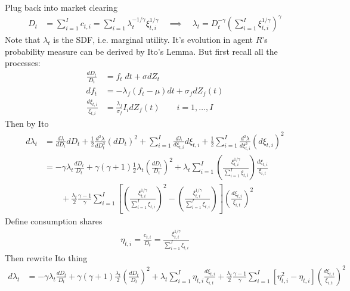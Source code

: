 \documentclass[12pt]{article}
\theoremstyle{plain}
\theoremstyle{definition}
\theoremstyle{remark}
\begin{document}
Plug back into market clearing
\begin{align*}
  D_t
  &=
  \sum_{i=1}^I c_{t,i}
  =
  \sum_{i=1}^I
  \lambda_t^{-1/\gamma}
  \xi_{t,i}^{1/\gamma}
  \quad\implies\quad
  \lambda_t
  =
  D_t^{-\gamma}
  \left(
  \sum_{i=1}^I
  \xi_{t,i}^{1/\gamma}
  \right)^{\gamma}
\end{align*}
Note that $\lambda_t$ is the SDF, i.e. marginal utility.
It's evolution in agent $R$'s probability measure can be derived by
Ito's Lemma. But first recall all the processes:
\begin{align*}
  \frac{dD_t}{D_t}
  &=
  f_t\;dt + \sigma dZ_t
  \\
  df_t
  &=
  -\lambda_f
  (f_t-\mu)dt
  + \sigma_f dZ_f(t)
  \\
  \frac{d\xi_{t,i}}{\xi_{t,i}}
  &=
  \frac{\lambda_f}{\sigma_f} I_i
  dZ_f(t)
  \qquad i = 1,\ldots,I
\end{align*}
Then by Ito
\begin{align*}
  d\lambda_t
  &=
  \frac{d\lambda}{dD_t}
  dD_t
  +
  \frac{1}{2}
  \frac{d^2\lambda}{dD_t^2}
  (dD_t)^2
  +
  \sum_{i=1}^I
  \frac{d\lambda}{d\xi_{t,i}}
  d\xi_{t,i}
  +
  \frac{1}{2}
  \sum_{i=1}^I
  \frac{d^2\lambda}{d\xi_{t,i}^2}
  (d\xi_{t,i})^2
  \\
  &=
  -\gamma
  \lambda_t
  \frac{dD_t}{D_t}
  +
  \gamma(\gamma+1)
  \frac{1}{2}
  \lambda_t
  \left(
  \frac{dD_t}{D_t}
  \right)^2
  +
  \lambda_t
  \sum_{i=1}^I
  \left(
  \frac{\xi_{t,i}^{1/\gamma}}{\sum_{i=1}^I \xi_{t,i}}
  \right)
  \frac{d\xi_{t,i}}{\xi_{i,t}}
  \\
  &\qquad
  +
  \frac{\lambda_t}{2}
  \frac{\gamma-1}{\gamma}
  \sum_{i=1}^I
  \left[
    \left(
    \frac{\xi_{t,i}^{1/\gamma}}{\sum_{i=1}^I \xi_{t,i}}
    \right)^2
    -
    \left(
    \frac{\xi_{t,i}^{1/\gamma}}{\sum_{i=1}^I \xi_{t,i}}
    \right)
  \right]
  \left(
  \frac{d\xi_{t,i}}{\xi_{i,t}}
  \right)^2
\end{align*}
Define consumption shares
\begin{align*}
  \eta_{t,i}
  =
  \frac{c_{t,i}}{D_t}
  =
  \frac{\xi_{t,i}^{1/\gamma}}{\sum_{i=1}^I \xi_{t,i}}
\end{align*}
Then rewrite Ito thing
\begin{align*}
  d\lambda_t
  &=
  -\gamma
  \lambda_t
  \frac{dD_t}{D_t}
  +
  \gamma(\gamma+1)
  \frac{\lambda_t }{2}
  \left(
  \frac{dD_t}{D_t}
  \right)^2
  +
  \lambda_t
  \sum_{i=1}^I
  \eta_{t,i}
  \frac{d\xi_{t,i}}{\xi_{i,t}}
  +
  \frac{\lambda_t}{2}
  \frac{\gamma-1}{\gamma}
  \sum_{i=1}^I
  \left[
    \eta_{t,i}^2
    -
    \eta_{t,i}
  \right]
  \left(
  \frac{d\xi_{t,i}}{\xi_{i,t}}
  \right)^2
\end{align*}
\end{document}
